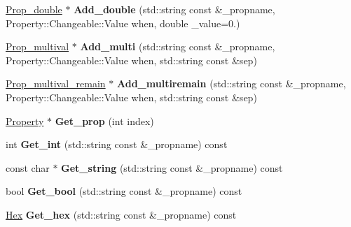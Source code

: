 \begin{DoxyCompactItemize}
\item 
\hypertarget{classSection__prop_a4bf7d7f3f55b561d75e17a051506f1e4}{\hyperlink{classProp__double}{Prop\-\_\-double} $\ast$ {\bfseries Add\-\_\-double} (std\-::string const \&\-\_\-propname, Property\-::\-Changeable\-::\-Value when, double \-\_\-value=0.)}\label{classSection__prop_a4bf7d7f3f55b561d75e17a051506f1e4}

\item 
\hypertarget{classSection__prop_a5e13d1fd48e06f1422b453ddb8295cce}{\hyperlink{classProp__multival}{Prop\-\_\-multival} $\ast$ {\bfseries Add\-\_\-multi} (std\-::string const \&\-\_\-propname, Property\-::\-Changeable\-::\-Value when, std\-::string const \&sep)}\label{classSection__prop_a5e13d1fd48e06f1422b453ddb8295cce}

\item 
\hypertarget{classSection__prop_a28af543dfeec843e42c4d727c1fcc872}{\hyperlink{classProp__multival__remain}{Prop\-\_\-multival\-\_\-remain} $\ast$ {\bfseries Add\-\_\-multiremain} (std\-::string const \&\-\_\-propname, Property\-::\-Changeable\-::\-Value when, std\-::string const \&sep)}\label{classSection__prop_a28af543dfeec843e42c4d727c1fcc872}

\item 
\hypertarget{classSection__prop_a0c5c7660c469b8182a35e538a061d32e}{\hyperlink{classProperty}{Property} $\ast$ {\bfseries Get\-\_\-prop} (int index)}\label{classSection__prop_a0c5c7660c469b8182a35e538a061d32e}

\item 
\hypertarget{classSection__prop_ab2f0390255ebba00eabae922b10666c0}{int {\bfseries Get\-\_\-int} (std\-::string const \&\-\_\-propname) const }\label{classSection__prop_ab2f0390255ebba00eabae922b10666c0}

\item 
\hypertarget{classSection__prop_a4fff92d2ce913ece6db7267acb32cbd2}{const char $\ast$ {\bfseries Get\-\_\-string} (std\-::string const \&\-\_\-propname) const }\label{classSection__prop_a4fff92d2ce913ece6db7267acb32cbd2}

\item 
\hypertarget{classSection__prop_aaeba2edf839ba6d0a3514865170c1c67}{bool {\bfseries Get\-\_\-bool} (std\-::string const \&\-\_\-propname) const }\label{classSection__prop_aaeba2edf839ba6d0a3514865170c1c67}

\item 
\hypertarget{classSection__prop_a27ea3faaa366883d57485239eca1fc48}{\hyperlink{classHex}{Hex} {\bfseries Get\-\_\-hex} (std\-::string const \&\-\_\-propname) const }\label{classSection__prop_a27ea3faaa366883d57485239eca1fc48}


\end{DoxyCompactItemize}
